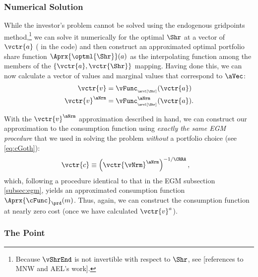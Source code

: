\documentclass[\econtexRoot/SolvingMicroDSOPs]{subfiles}
\begin{document}
\subsubsection{Numerical Solution}
While the investor's problem cannot be solved using the endogenous gridpoints method,\footnote{Because $\vShrEnd$ is not invertible with respect to $\Shr$, see [references to MNW and AEL's work].} 
we can solve it numerically for the optimal $\Shr$ at a vector of $\vctr{a}$ ({\aVecCode} in the code)  and then construct an approximated optimal portfolio share function $\Aprx{\optml{\Shr}}(a)$ as the interpolating function among the members of the $\{\vctr{a},\vctr{\Shr}\}$ mapping.  Having done this, we can now calculate a vector of values and marginal values that correspond to $\aVec$:
\begin{equation}\begin{gathered}\begin{aligned}
      \vctr{v}  & = \vFunc_{_\arvl[\Shr]}(\vctr{a}) \label{eq:vShrEnd}
\\      \vctr{v}^\aNrm  & = \vFunc^{\aNrm}_{_\arvl[\Shr]}(\vctr{a}).
    \end{aligned}\end{gathered}\end{equation}

With the $\vctr{v}^{\aNrm}$ approximation described in hand, we can construct our approximation to the consumption function using \emph{exactly the same EGM procedure} that we used in solving the problem \emph{without} a portfolio choice (see \eqref{eq:cGoth}):
\begin{equation}\begin{gathered}\begin{aligned}
      \vctr{c}  & \equiv  \left(\vctr{\vNrm}^{\aNrm}\right)^{-1/\CRRA} \label{eq:cVecPort},
    \end{aligned}\end{gathered}\end{equation}
which, following a procedure identical to that in the EGM subsection \ref{subsec:egm}, yields an approximated consumption function $\Aprx{\cFunc}_{\prd}(m)$.  Thus, again, we can construct the consumption function at nearly zero cost (once we have calculated $\vctr{v}^{a}$).

\hypertarget{the-point}{}

\subsubsection{The Point}\label{subsubsec:the-point}
\end{document}
